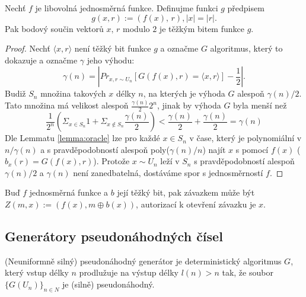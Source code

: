 \begin{thm}
	Nechť $f$ je libovolná jednosměrná funkce. Definujme funkci $g$ předpisem
	\[
		g(x,r):=(f(x),\,r), |x|=|r|. 
	\]
	Pak bodový součin vektorů $x,\,r$ modulo $2$ je těžkým bitem funkce $g$.
	\begin{proof}
		Nechť $\langle x,r \rangle$ není těžký bit funkce $g$ a označme $G$ algoritmus, který to dokazuje a označme $\gamma$ jeho výhodu:
		\[
			\gamma(n)=|Pr_{x,r\sim U_n}[G(f(x),r) = \langle x,r\rangle]-\frac{1}{2}|.
		\]
		Budiž $S_n$ množina takových $x$ délky $n$, na kterých je výhoda $G$ alespoň $\gamma(n)/2$. Tato množina má velikost alespoň $\frac{\gamma(n)}{2}2^n$, jinak by výhoda $G$ byla menší než
		\[
			\frac{1}{2^n}\left(\Sigma_{x\in S_n}1+\Sigma_{x\not\in S_n}\frac{\gamma(n)}{2}\right)<\frac{\gamma(n)}{2}+\frac{\gamma(n)}{2}=\gamma(n)
		\]
		Dle Lemmatu \ref{lemma:oracle} lze pro každé $x\in S_n$ v čase, který je polynomiální v $n/\gamma(n)$ a s pravděpodobností alespoň poly($\gamma(n)/n$) najít $x$ s pomocí $f(x)$ ($b_x(r)=G(f(x),r)$). Protože $x\sim U_n$ leží v $S_n$ s pravděpodobností alespoň $\gamma(n)/2$ a $\gamma(n)$ není zanedbatelná, dostáváme spor s jednosměrností $f$.
	\end{proof}
\end{thm}

Buď $f$ jednosměrná funkce a $b$ její těžký bit, pak závazkem může být $Z(m,x):=(f(x),m\oplus b(x))$, autorizací k otevření závazku je $x$.

\subsection*{Generátory pseudonáhodných čísel}

\begin{defn}
	(Neuniformně silný) pseudonáhodný generátor je deterministický algoritmus $G$, který vstup délky $n$ prodlužuje na výstup délky $l(n)>n$ tak, že soubor $\{G(U_n)\}_{n\in N}$ je (silně) pseudonáhodný.
\end{defn}

